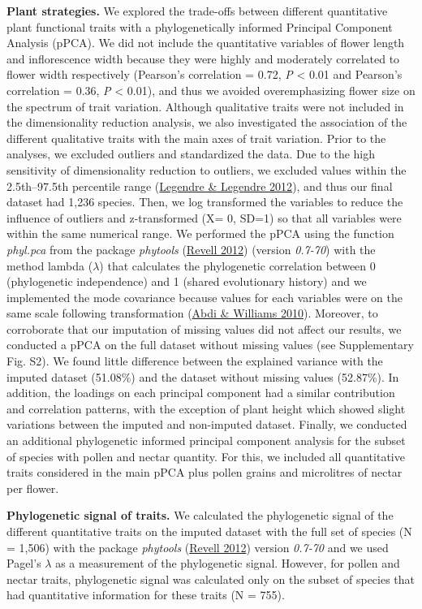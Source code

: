 \documentclass[
  12pt,
  a4paper,
]{article}
\begin{document}
\textbf{Plant strategies.} We explored the trade-offs between different quantitative plant functional traits with a phylogenetically informed Principal Component Analysis (pPCA). We did not include the quantitative variables of flower length and inflorescence width because they were highly and moderately correlated to flower width respectively (Pearson's correlation = 0.72, \emph{P} \textless{} 0.01 and Pearson's correlation = 0.36, \emph{P} \textless{} 0.01), and thus we avoided overemphasizing flower size on the spectrum of trait variation. Although qualitative traits were not included in the dimensionality reduction analysis, we also investigated the association of the different qualitative traits with the main axes of trait variation. Prior to the analyses, we excluded outliers and standardized the data. Due to the high sensitivity of dimensionality reduction to outliers, we excluded values within the 2.5th--97.5th percentile range (\protect\hyperlink{ref-legendre2012}{Legendre \& Legendre 2012}), and thus our final dataset had 1,236 species. Then, we log transformed the variables to reduce the influence of outliers and z-transformed (X= 0, SD=1) so that all variables were within the same numerical range. We performed the pPCA using the function \emph{phyl.pca} from the package \emph{phytools} (\protect\hyperlink{ref-revell2012}{Revell 2012}) (version \emph{0.7-70}) with the method lambda (\(\lambda\)) that calculates the phylogenetic correlation between 0 (phylogenetic independence) and 1 (shared evolutionary history) and we implemented the mode covariance because values for each variables were on the same scale following transformation (\protect\hyperlink{ref-abdi2010}{Abdi \& Williams 2010}). Moreover, to corroborate that our imputation of missing values did not affect our results, we conducted a pPCA on the full dataset without missing values (see Supplementary Fig. S2). We found little difference between the explained variance with the imputed dataset (51.08\%) and the dataset without missing values (52.87\%). In addition, the loadings on each principal component had a similar contribution and correlation patterns, with the exception of plant height which showed slight variations between the imputed and non-imputed dataset. Finally, we conducted an additional phylogenetic informed principal component analysis for the subset of species with pollen and nectar quantity. For this, we included all quantitative traits considered in the main pPCA plus pollen grains and microlitres of nectar per flower.

\textbf{Phylogenetic signal of traits.} We calculated the phylogenetic signal of the different quantitative traits on the imputed dataset with the full set of species (N = 1,506) with the package \emph{phytools} (\protect\hyperlink{ref-revell2012}{Revell 2012}) version \emph{0.7-70} and we used Pagel's \(\lambda\) as a measurement of the phylogenetic signal. However, for pollen and nectar traits, phylogenetic signal was calculated only on the subset of species that had quantitative information for these traits (N = 755).
\end{document}
